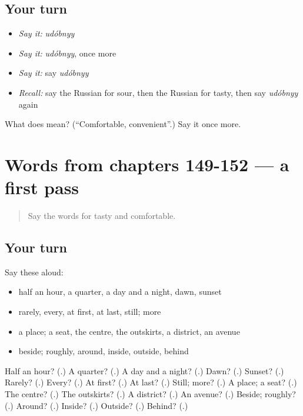 \subsection*{Your turn}
\begin{itemize}
\raggedright
  \item \emph{Say it:} \emph{udóbnyy}
  \item \emph{Say it:} \emph{udóbnyy}, once more
  \item \emph{Say it:} say \emph{udóbnyy}
  \item \emph{Recall:} say the Russian for sour, then the Russian for tasty, then say \emph{udóbnyy} again
\end{itemize}

\begin{tcolorbox}[breakable,colback=teal!4,colframe=teal!35!black,title={Before you move on}]
What does  mean? (\textquotedblleft{}Comfortable, convenient\textquotedblright{}.) Say it once more.
\end{tcolorbox}
\section[(dialogue)]{Words from chapters 149-152 — a first pass}

\label{lesson:RU-R157-first-pass-words-from-chapters-149-152}



\begin{quote}
Say the words for tasty and comfortable.
\end{quote}

\subsection*{Your turn}
Say these aloud:

\begin{itemize}
\raggedright
  \item half an hour, a quarter, a day and a night, dawn, sunset
  \item rarely, every, at first, at last, still; more
  \item a place; a seat, the centre, the outskirts, a district, an avenue
  \item beside; roughly, around, inside, outside, behind
\end{itemize}

\begin{tcolorbox}[breakable,colback=teal!4,colframe=teal!35!black,title={Before you move on}]
Half an hour? (\textbf{}.) A quarter? (\textbf{}.) A day and a night? (\textbf{}.) Dawn? (\textbf{}.) Sunset? (\textbf{}.) Rarely? (\textbf{}.) Every? (\textbf{}.) At first? (\textbf{}.) At last? (\textbf{}.) Still; more? (\textbf{}.) A place; a seat? (\textbf{}.) The centre? (\textbf{}.) The outskirts? (\textbf{}.) A district? (\textbf{}.) An avenue? (\textbf{}.) Beside; roughly? (\textbf{}.) Around? (\textbf{}.) Inside? (\textbf{}.) Outside? (\textbf{}.) Behind? (\textbf{}.)
\end{tcolorbox}
